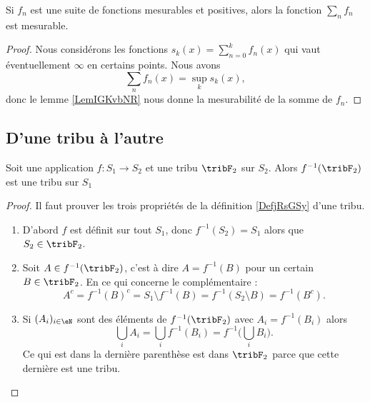 \begin{proposition}\label{PropFYPEOIJ}
    Si \( f_n\) est une suite de fonctions mesurables et positives, alors la fonction \( \sum_nf_n\) est mesurable.
\end{proposition}

\begin{proof}
    Nous considérons les fonctions \( s_k(x)=\sum_{n=0}^kf_n(x)\) qui vaut éventuellement \( \infty\) en certains points. Nous avons
    \begin{equation}
        \sum_nf_n(x)=\sup_ks_k(x),
    \end{equation}
    donc le lemme \ref{LemIGKvbNR} nous donne la mesurabilité de la somme de \( f_n\).
\end{proof}

\subsection{D'une tribu à l'autre}


\begin{lemma}
    Soit une application \( f\colon S_1\to S_2\) et une tribu \( \tribF_2\) sur \( S_2\). Alors \( f^{-1}(\tribF_2)\) est une tribu sur \( S_1\)
\end{lemma}

\begin{proof}
    Il faut prouver les trois propriétés de la définition \ref{DefjRsGSy} d'une tribu.
    \begin{enumerate}
        \item
            D'abord \( f\) est définit sur tout \( S_1\), donc \( f^{-1}(S_2)=S_1\) alors que \( S_2\in \tribF_2\).
        \item
            Soit \( A\in f^{-1}(\tribF_2)\), c'est à dire \( A=f^{-1}(B)\) pour un certain \( B\in \tribF_2\). En ce qui concerne le complémentaire :
            \begin{equation}
                A^c=f^{-1}(B)^c=S_1\setminus f^{-1}(B)=f^{-1}(S_2\setminus B)=f^{-1}(B^c).
            \end{equation}
        \item
            Si \( (A_i)_{i\in \eN}\) sont des éléments de \( f^{-1}(\tribF_2)\) avec \( A_i=f^{-1}(B_i)\) alors
            \begin{equation}
                \bigcup_iA_i=\bigcup_if^{-1}(B_i)=f^{-1}\big( \bigcup_iB_i \big).
            \end{equation}
            Ce qui est dans la dernière parenthèse est dans \( \tribF_2\) parce que cette dernière est une tribu.
    \end{enumerate}
\end{proof}

